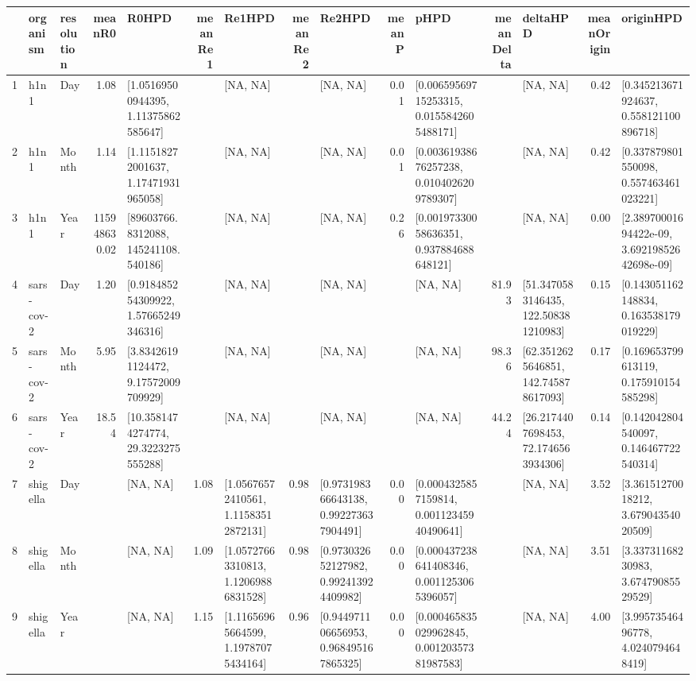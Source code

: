 \begin{table}[ht]
\centering
\begin{tabular}{rllrlrlrlrlrlrl}
  \hline
 & organism & resolution & meanR0 & R0HPD & meanRe1 & Re1HPD & meanRe2 & Re2HPD & meanP & pHPD & meanDelta & deltaHPD & meanOrigin & originHPD \\ 
  \hline
1 & h1n1 & Day & 1.08 & [1.05169500944395, 1.11375862585647] &  & [NA, NA] &  & [NA, NA] & 0.01 & [0.00659569715253315, 0.0155842605488171] &  & [NA, NA] & 0.42 & [0.345213671924637, 0.558121100896718] \\ 
  2 & h1n1 & Month & 1.14 & [1.11518272001637, 1.17471931965058] &  & [NA, NA] &  & [NA, NA] & 0.01 & [0.00361938676257238, 0.0104026209789307] &  & [NA, NA] & 0.42 & [0.337879801550098, 0.557463461023221] \\ 
  3 & h1n1 & Year & 115948630.02 & [89603766.8312088, 145241108.540186] &  & [NA, NA] &  & [NA, NA] & 0.26 & [0.00197330058636351, 0.937884688648121] &  & [NA, NA] & 0.00 & [2.38970001694422e-09, 3.69219852642698e-09] \\ 
  4 & sars-cov-2 & Day & 1.20 & [0.918485254309922, 1.57665249346316] &  & [NA, NA] &  & [NA, NA] &  & [NA, NA] & 81.93 & [51.3470583146435, 122.508381210983] & 0.15 & [0.143051162148834, 0.163538179019229] \\ 
  5 & sars-cov-2 & Month & 5.95 & [3.83426191124472, 9.17572009709929] &  & [NA, NA] &  & [NA, NA] &  & [NA, NA] & 98.36 & [62.3512625646851, 142.745878617093] & 0.17 & [0.169653799613119, 0.175910154585298] \\ 
  6 & sars-cov-2 & Year & 18.54 & [10.3581474274774, 29.3223275555288] &  & [NA, NA] &  & [NA, NA] &  & [NA, NA] & 44.24 & [26.2174407698453, 72.1746563934306] & 0.14 & [0.142042804540097, 0.146467722540314] \\ 
  7 & shigella & Day &  & [NA, NA] & 1.08 & [1.05676572410561, 1.11583512872131] & 0.98 & [0.973198366643138, 0.992273637904491] & 0.00 & [0.0004325857159814, 0.00112345940490641] &  & [NA, NA] & 3.52 & [3.36151270018212, 3.67904354020509] \\ 
  8 & shigella & Month &  & [NA, NA] & 1.09 & [1.05727663310813, 1.12069886831528] & 0.98 & [0.973032652127982, 0.992413924409982] & 0.00 & [0.000437238641408346, 0.0011253065396057] &  & [NA, NA] & 3.51 & [3.33731168230983, 3.67479085529529] \\ 
  9 & shigella & Year &  & [NA, NA] & 1.15 & [1.11656965664599, 1.19787075434164] & 0.96 & [0.944971106656953, 0.968495167865325] & 0.00 & [0.000465835029962845, 0.00120357381987583] &  & [NA, NA] & 4.00 & [3.99573546496778, 4.0240794648419] \\ 

\end{tabular}
\end{table}
